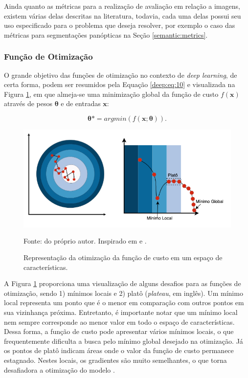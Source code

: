 Ainda quanto as métricas para a realização de avaliação em relação a imagens, existem várias delas descritas na literatura, todavia,  cada uma delas possui seu uso especificado para o problema que deseja resolver, por exemplo o caso das métricas para segmentações panópticas na Seção \ref{semantic:metrics}.


\subsubsection{Função de Otimização}
\label{deep:optimization}

O grande objetivo das funções de otimização no contexto de \textit{deep learning}, de certa forma, podem ser resumidos pela Equação \ref{deep:eq:10} e visualizada na Figura \ref{deep:fig:otimizacao}, em que almeja-se uma minimização global da função de custo $f(\boldsymbol{x})$ através de pesos $\boldsymbol{\theta}$ e de entradas $\boldsymbol{x}$:

\begin{equation}
    \label{deep:eq:10}
    \boldsymbol{\theta}* = argmin(f(\boldsymbol{x};\boldsymbol{\theta})).
\end{equation}

\begin{figure}[H]
    \centering
    \caption{Representação da otimização da função de custo em um espaço de características.}
    \includegraphics[width=1\linewidth]{recursos/imagens/deep/funcao_otimizacao.png}
    \label{deep:fig:otimizacao}

    Fonte: do próprio autor. Inspirado em \cite{MontesinosLopez2022ArtificialOutcomes} e \cite{Geron2017Hands-onSystems}.
\end{figure}

A Figura \ref{deep:fig:otimizacao} proporciona uma visualização de alguns desafios para as funções de otimização, sendo 1) mínimos locais e 2) platô (\textit{plateau}, em inglês). Um mínimo local representa um ponto que é o menor em comparação com outros pontos em sua vizinhança próxima. Entretanto, é importante notar que um mínimo local nem sempre corresponde ao menor valor em todo o espaço de características. Dessa forma, a função de custo pode apresentar vários mínimos locais, o que frequentemente dificulta a busca pelo mínimo global desejado na otimização\citep{Goodfellow2016}. Já os pontos de platô indicam áreas onde o valor da função de custo permanece estagnado. Nestes locais, os gradientes são muito semelhantes, o que torna desafiadora a otimização do modelo \cite{Goodfellow2016}.

